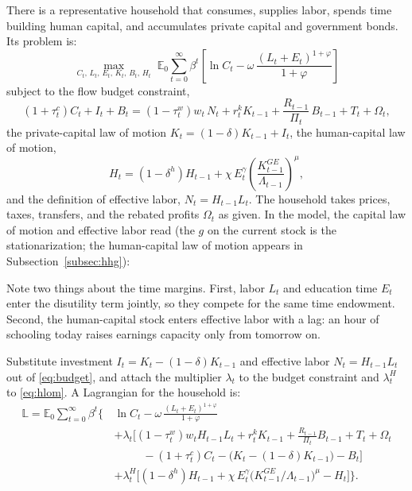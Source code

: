 \documentclass[11pt]{article}
\newcommand{\modelcode}[1]{%
  \par\smallskip\noindent\hspace*{\fill}%
  \fbox{\parbox{0.94\linewidth}{\small\ttfamily\raggedright #1}}%
  \hspace*{\fill}\par\smallskip}
\begin{document}
There is a representative household that consumes, supplies labor, spends time
building human capital, and accumulates private capital and government bonds. Its
problem is:
\begin{equation*}
    \max_{C_t,\,L_t,\,E_t,\,K_t,\,B_t,\,H_t} \;
    \mathbb{E}_0 \sum_{t=0}^{\infty} \beta^{t}
    \left[\ln C_t - \omega\,\frac{\left(L_t + E_t\right)^{1+\varphi}}{1+\varphi}\right]
\end{equation*}
subject to the flow budget constraint,
\begin{equation}\label{eq:budget}
    \left(1+\tau_t^{c}\right) C_t + I_t + B_t
    = \left(1-\tau_t^{w}\right) w_t\, N_t + r_t^{k} K_{t-1}
    + \frac{R_{t-1}}{\Pi_t}\, B_{t-1} + T_t + \Omega_t,
\end{equation}
the private-capital law of motion $K_t = (1-\delta)K_{t-1} + I_t$, the
human-capital law of motion,
\begin{equation}\label{eq:hlom}
    H_t = \left(1-\delta^{h}\right) H_{t-1}
    + \chi\, E_t^{\gamma} \left(\frac{K_{t-1}^{GE}}{\Lambda_{t-1}}\right)^{\mu},
\end{equation}
and the definition of effective labor, $N_t = H_{t-1} L_t$. The household takes
prices, taxes, transfers, and the rebated profits $\Omega_t$ as given. In the
model, the capital law of motion and effective labor read (the $g$ on the
current stock is the stationarization; the human-capital law of motion appears
in Subsection~\ref{subsec:hhg}):
\modelcode{Kp*g = (1-delta)*Kp(-1)+Ip;\\
N = L*H(-1);}
Note two
things about the time margins. First, labor $L_t$ and education time $E_t$ enter
the disutility term jointly, so they compete for the same time endowment. Second,
the human-capital stock enters effective labor with a lag: an hour of schooling
today raises earnings capacity only from tomorrow on.

Substitute investment $I_t = K_t - (1-\delta)K_{t-1}$ and effective labor
$N_t = H_{t-1}L_t$ out of \eqref{eq:budget}, and attach the multiplier $\lambda_t$
to the budget constraint and $\lambda_t^{H}$ to \eqref{eq:hlom}. A Lagrangian for
the household is:
\begin{equation*}
\begin{aligned}
    \mathbb{L} = \mathbb{E}_0 \sum_{t=0}^{\infty} \beta^{t} \Big\{\,
    & \ln C_t - \omega\,\frac{\left(L_t + E_t\right)^{1+\varphi}}{1+\varphi} \\
    & + \lambda_t \Big[\left(1-\tau_t^{w}\right) w_t H_{t-1} L_t
      + r_t^{k} K_{t-1} + \tfrac{R_{t-1}}{\Pi_t} B_{t-1} + T_t + \Omega_t \\
    & \qquad\;\; - \left(1+\tau_t^{c}\right) C_t
      - \big(K_t - (1-\delta) K_{t-1}\big) - B_t \Big] \\
    & + \lambda_t^{H} \Big[\left(1-\delta^{h}\right) H_{t-1}
      + \chi\, E_t^{\gamma} \big(K_{t-1}^{GE}/\Lambda_{t-1}\big)^{\mu}
      - H_t \Big] \Big\}.
\end{aligned}
\end{equation*}
\end{document}
